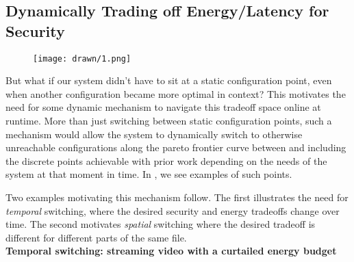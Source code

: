 \subsection{Dynamically Trading off Energy/Latency for Security}

\begin{figure}[ht]
 \centering
  \texttt{[image: drawn/1.png]}
   \caption{}\label{fig:40mb-read-with-forward}
\end{figure}

But what if our system didn't have to sit at a static configuration point, even
when another configuration became more optimal in context? This motivates the
need for some dynamic mechanism to navigate this tradeoff space online at
runtime. More than just switching between static configuration points, such a
mechanism would allow the system to dynamically switch to otherwise unreachable
configurations along the pareto frontier curve between and including the
discrete points achievable with prior work depending on the needs of the system
at that moment in time. In , we see examples of
such points. 

Two examples motivating this mechanism follow. The first illustrates the need for \emph{temporal} switching, where the desired security and energy tradeoffs change over time.  The second motivates \emph{spatial} switching where the desired tradeoff is different for different parts of the same file.  \\


\noindent
\textbf{Temporal switching: streaming video with a curtailed energy budget}

 

